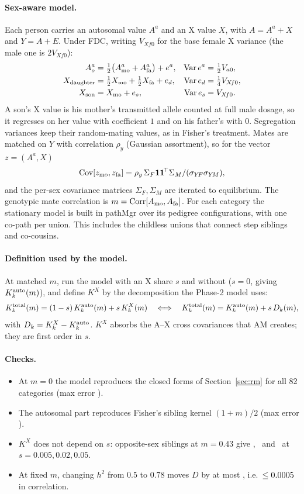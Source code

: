 \documentclass[11pt]{article}
\newcommand{\Cov}{\operatorname{Cov}}
\newcommand{\Var}{\operatorname{Var}}
\newcommand{\Kx}{K^{X}}
\newcommand{\Ka}{K^{\rm auto}}
\begin{document}
\paragraph{Sex-aware model.} Each person carries an autosomal value $A^a$ and an X value $X$, with $A=A^a+X$
and $Y=A+E$. Under FDC, writing $V_{X\!f0}$ for the base female X variance (the male one is $2V_{X\!f0}$):
\[
\begin{aligned}
A^a_o&=\tfrac12\big(A^a_{\rm mo}+A^a_{\rm fa}\big)+e^a, & \Var e^a&=\tfrac12V_{a0},\\
X_{\rm daughter}&=\tfrac12X_{\rm mo}+\tfrac12X_{\rm fa}+e_d, & \Var e_d&=\tfrac14V_{X\!f0},\\
X_{\rm son}&=X_{\rm mo}+e_s, & \Var e_s&=V_{X\!f0}.
\end{aligned}
\]
A son's X value is his mother's transmitted allele counted at full male dosage, so it regresses on her value
with coefficient $1$ and on his father's with $0$. Segregation variances keep their random-mating values, as
in Fisher's treatment. Mates are matched on $Y$ with correlation $\rho_y$ (Gaussian assortment), so for the
vector $z=(A^a,X)$
\[
\Cov[z_{\rm mo},z_{\rm fa}]=\rho_y\,\Sigma_F\mathbf 1\mathbf 1^{\!\top}\Sigma_M/(\sigma_{Y\!F}\sigma_{Y\!M}),
\]
and the per-sex covariance matrices $\Sigma_F,\Sigma_M$ are iterated to equilibrium. The genotypic mate
correlation is $m=\operatorname{Corr}[A_{\rm mo},A_{\rm fa}]$. For each category the stationary model is built
in pathMgr over its pedigree configurations, with one co-path per union. This includes the childless unions
that connect step siblings and co-cousins.

\paragraph{Definition used by the model.} At matched $m$, run the model with an X share $s$ and without
($s=0$, giving $\Ka_k(m)$), and define $\Kx$ by the decomposition the Phase-2 model uses:
\[
K^{\rm total}_k(m)=(1-s)\,\Ka_k(m)+s\,\Kx_k(m)
\quad\Longleftrightarrow\quad
K^{\rm total}_k(m)=\Ka_k(m)+s\,D_k(m),
\]
with $D_k=\Kx_k-\Ka_k$.
$\Kx$ absorbs the A--X cross covariances that AM creates; they are first order in $s$.

\paragraph{Checks.}
\begin{itemize}
  \item At $m=0$ the model reproduces the closed forms of Section~\ref{sec:rm} for all 82 categories (max
    error \chkRM).
  \item The autosomal part reproduces Fisher's sibling kernel $(1+m)/2$ (max error \chkFisher).
  \item $\Kx$ does not depend on $s$: opposite-sex siblings at $m=0.43$ give \chkSa, \chkSb\ and \chkSc\ at
    $s=0.005,0.02,0.05$.
  \item At fixed $m$, changing $h^2$ from $0.5$ to $0.78$ moves $D$ by at most \chkHtwo, i.e.\
    $\le0.0005$ in correlation.
\end{itemize}
\end{document}
